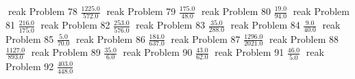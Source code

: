 \documentclass{article}
\begin{document}
\newline
\hfill reak
Problem 78
\newline
\hfill \break
$\displaystyle \frac{1225.0}{572.0}$
\newline
\hfill reak
Problem 79
\newline
\hfill \break
$\displaystyle \frac{175.0}{48.0}$
\newline
\hfill reak
Problem 80
\newline
\hfill \break
$\displaystyle \frac{19.0}{94.0}$
\newline
\hfill reak
Problem 81
\newline
\hfill \break
$\displaystyle \frac{216.0}{175.0}$
\newline
\hfill reak
Problem 82
\newline
\hfill \break
$\displaystyle \frac{253.0}{576.0}$
\newline
\hfill reak
Problem 83
\newline
\hfill \break
$\displaystyle \frac{35.0}{288.0}$
\newline
\hfill reak
Problem 84
\newline
\hfill \break
$\displaystyle \frac{9.0}{40.0}$
\newline
\hfill reak
Problem 85
\newline
\hfill \break
$\displaystyle \frac{5.0}{70.0}$
\newline
\hfill reak
Problem 86
\newline
\hfill \break
$\displaystyle \frac{184.0}{637.0}$
\newline
\hfill reak
Problem 87
\newline
\hfill \break
$\displaystyle \frac{1296.0}{2021.0}$
\newline
\hfill reak
Problem 88
\newline
\hfill \break
$\displaystyle \frac{1127.0}{893.0}$
\newline
\hfill reak
Problem 89
\newline
\hfill \break
$\displaystyle \frac{35.0}{6.0}$
\newline
\hfill reak
Problem 90
\newline
\hfill \break
$\displaystyle \frac{43.0}{62.0}$
\newline
\hfill reak
Problem 91
\newline
\hfill \break
$\displaystyle \frac{46.0}{5.0}$
\newline
\hfill reak
Problem 92
\newline
\hfill \break
$\displaystyle \frac{403.0}{448.0}$
\newline
\end{document}
